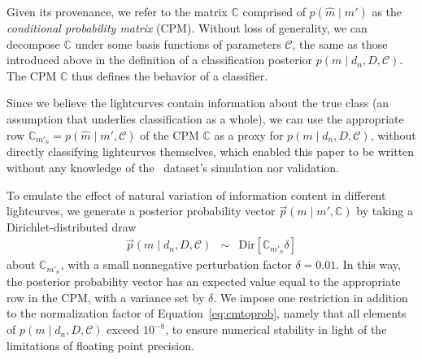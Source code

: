 Given its provenance, we refer to the matrix $\mathbb{C}$ comprised of $p(\hat{m} \mid m')$ as the \textit{conditional probability matrix} (CPM).
Without loss of generality, we can decompose $\mathbb{C}$ under some basis functions of parameters $\mathcal{C}$, the same as those introduced above in the definition of a classification posterior $p(m \mid d_{n}, D, \mathcal{C})$.
The CPM $\mathbb{C}$ thus defines the behavior of a classifier.


Since we believe the lightcurves contain information about the true class (an assumption that underlies classification as a whole), we can use the appropriate row $\mathbb{C}_{m'_{n}} = p(\hat{m} \mid m', \mathcal{C})$ of the CPM $\mathbb{C}$ as a proxy for $p(m \mid d_{n}, D, \mathcal{C})$, without directly classifying lightcurves themselves, which enabled this paper to be written without any knowledge of the \plasticc\ dataset's simulation nor validation.

To emulate the effect of natural variation of information content in different lightcurves, we generate a posterior probability vector $\vec{p}(m \mid m', \mathbb{C})$ by taking a Dirichlet-distributed draw
\begin{eqnarray}
  \label{eq:cmtoprob}
  \vec{p}(m \mid d_{n}, D, \mathcal{C}) &\sim& \mathrm{Dir}[\mathbb{C}_{m'_{n}} \delta]
\end{eqnarray}
about $\mathbb{C}_{m'_{n}}$, with a small nonnegative perturbation factor $\delta = 0.01$.
In this way, the posterior probability vector has an expected value equal to the appropriate row in the CPM, with a variance set by $\delta$.
We impose one restriction in addition to the normalization factor of Equation~\ref{eq:cmtoprob}, namely that all elements of $p(m \mid d_{n}, D, \mathcal{C})$ exceed $10^{-8}$, to ensure numerical stability in light of the limitations of floating point precision.

